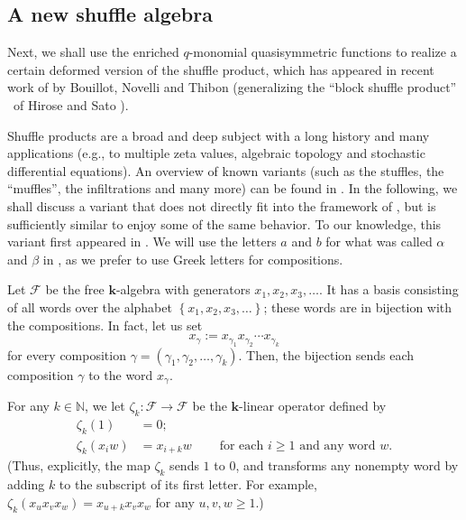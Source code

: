 \documentclass[numbers=enddot,12pt,final,onecolumn,notitlepage]{scrartcl}%
\theoremstyle{definition}
\begin{document}
\subsection{A new shuffle algebra}

Next, we shall use the enriched $q$-monomial quasisymmetric functions to
realize a certain deformed version of the shuffle product, which has appeared
in recent work of \cite{BoNoTh22} by Bouillot, Novelli and Thibon
(generalizing the \textquotedblleft block shuffle product\textquotedblright%
\ of Hirose and Sato \cite[$\Diamond$]{HirSat22}).

Shuffle products are a broad and deep subject with a long history and many
applications (e.g., to multiple zeta values, algebraic topology and stochastic
differential equations). An overview of known variants (such as the stuffles,
the \textquotedblleft muffles\textquotedblright, the infiltrations and many
more) can be found in \cite[Table 1]{DEMT17}. In the following, we shall
discuss a variant that does not directly fit into the framework of
\cite{DEMT17}, but is sufficiently similar to enjoy some of the same behavior.
To our knowledge, this variant first appeared in \cite{BoNoTh22}. We will use
the letters $a$ and $b$ for what was called $\alpha$ and $\beta$ in
\cite{BoNoTh22}, as we prefer to use Greek letters for compositions.

Let $\mathcal{F}$ be the free $\mathbf{k}$-algebra with generators
$x_{1},x_{2},x_{3},\ldots$. It has a basis consisting of all words over the
alphabet $\left\{  x_{1},x_{2},x_{3},\ldots\right\}  $; these words are in
bijection with the compositions. In fact, let us set
\begin{equation}
x_{\gamma}:=x_{\gamma_{1}}x_{\gamma_{2}}\cdots x_{\gamma_{k}}
\label{eq.abshuf.xgamma=}%
\end{equation}
for every composition $\gamma=\left(  \gamma_{1},\gamma_{2},\ldots,\gamma
_{k}\right)  $. Then, the bijection sends each composition $\gamma$ to the
word $x_{\gamma}$.

For any $k\in\mathbb{N}$, we let $\zeta_{k}:\mathcal{F}\rightarrow\mathcal{F}$
be the $\mathbf{k}$-linear operator defined by%
\begin{align*}
\zeta_{k}\left(  1\right)   &  =0;\\
\zeta_{k}\left(  x_{i}w\right)   &  =x_{i+k}w\ \ \ \ \ \ \ \ \ \ \text{for
each }i\geq1\text{ and any word }w.
\end{align*}
(Thus, explicitly, the map $\zeta_{k}$ sends $1$ to $0$, and transforms any
nonempty word by adding $k$ to the subscript of its first letter. For example,
$\zeta_{k}\left(  x_{u}x_{v}x_{w}\right)  =x_{u+k}x_{v}x_{w}$ for any
$u,v,w\geq1$.)
\end{document}
